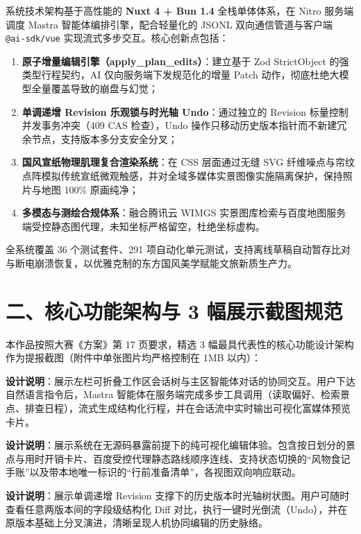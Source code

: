 \documentclass[11pt,a4paper,UTF8]{ctexart}
\begin{document}
系统技术架构基于高性能的 \textbf{Nuxt 4 + Bun 1.4} 全栈单体体系，在 Nitro 服务端调度 Mastra 智能体编排引擎，配合轻量化的 JSONL 双向通信管道与客户端 \texttt{@ai-sdk/vue} 实现流式多步交互。核心创新点包括：
\begin{enumerate}
    \item \textbf{原子增量编辑引擎（apply\_plan\_edits）}：建立基于 Zod StrictObject 的强类型行程契约，AI 仅向服务端下发规范化的增量 Patch 动作，彻底杜绝大模型全量覆盖导致的崩盘与幻觉；
    \item \textbf{单调递增 Revision 乐观锁与时光轴 Undo}：通过独立的 Revision 标量控制并发事务冲突（409 CAS 检查），Undo 操作只移动历史版本指针而不新建冗余节点，支持版本多分支安全分叉；
    \item \textbf{国风宣纸物理肌理复合渲染系统}：在 CSS 层面通过无缝 SVG 纤维噪点与帘纹点阵模拟传统宣纸微观触感，并对全域多媒体实景图像实施隔离保护，保持照片与地图 100\% 原画纯净；
    \item \textbf{多模态与测绘合规体系}：融合腾讯云 WIMGS 实景图库检索与百度地图服务端受控静态图代理，未知坐标严格留空，杜绝坐标虚构。
\end{enumerate}

全系统覆盖 36 个测试套件、291 项自动化单元测试，支持离线草稿自动暂存比对与断电崩溃恢复，以优雅克制的东方国风美学赋能文旅新质生产力。

\vspace{0.8em}
\section*{二、核心功能架构与 3 幅展示截图规范}

本作品按照大赛《方案》第 17 页要求，精选 3 幅最具代表性的核心功能设计架构作为提报截图（附件中单张图片均严格控制在 1MB 以内）：

\vspace{0.5em}

\begin{tcolorbox}[colback=white,colframe=bamboo!60,title=\textbf{展示图 1：智能体双栏沉浸式工作台与流式 ReAct 多步规划}]
\small
\textbf{设计说明}：展示左栏可折叠工作区会话树与主区智能体对话的协同交互。用户下达自然语言指令后，Mastra 智能体在服务端完成多步工具调用（读取偏好、检索景点、排查日程），流式生成结构化行程，并在会话流中实时输出可视化富媒体预览卡片。
\end{tcolorbox}

\vspace{0.5em}

\begin{tcolorbox}[colback=white,colframe=bamboo!60,title=\textbf{展示图 2：多维规划预览视图（行程舆图、风物食记与行前清单）}]
\small
\textbf{设计说明}：展示系统在无源码暴露前提下的纯可视化编辑体验。包含按日划分的景点与用时开销卡片、百度受控代理静态路线顺序连线、支持状态切换的“风物食记手账”以及带本地唯一标识的“行前准备清单”，各视图双向响应联动。
\end{tcolorbox}

\vspace{0.5em}

\begin{tcolorbox}[colback=white,colframe=bamboo!60,title=\textbf{展示图 3：版本时光轴路线图（Version Roadmap）与原子 Undo 回滚}]
\small
\textbf{设计说明}：展示单调递增 Revision 支撑下的历史版本时光轴树状图。用户可随时查看任意两版本间的字段级结构化 Diff 对比，执行一键时光倒流（Undo），并在原版本基础上分叉演进，清晰呈现人机协同编辑的历史脉络。
\end{tcolorbox}
\end{document}
